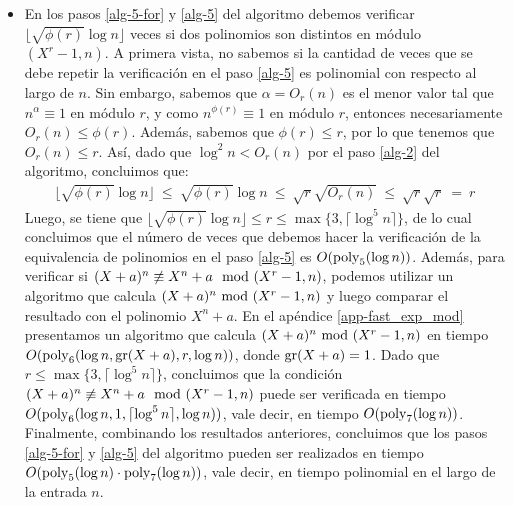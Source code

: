 \begin{itemize}
	
	\item En los pasos \ref{alg-5-for} y \ref{alg-5} del algoritmo debemos verificar $\lfloor \sqrt{\phi(r)} \log n\rfloor$ veces si dos polinomios son distintos en módulo $(X^r-1,n)$. A primera vista, no sabemos si la cantidad de veces que se debe repetir la verificación en el paso \ref{alg-5}
	es polinomial con respecto al largo de $n$. Sin embargo, sabemos que $\alpha = O_r(n)$ es el menor valor tal que $n^{\alpha}\equiv 1$ en módulo $r$, y como $n^{\phi(r)}\equiv 1$ en módulo $r$, entonces necesariamente $O_r(n)\leq \phi(r)$. Además, sabemos que $\phi(r)\leq r$, por lo que tenemos que $O_r(n)\leq r$. Así, dado que $\log^2 n < O_r(n)$ por el paso \ref{alg-2} del algoritmo, concluimos que:
	\begin{eqnarray}\label{cota-ell}
		\lfloor \sqrt{\phi(r)} \log n\rfloor \ \leq \ \sqrt{\phi(r)} \log n
		\ \leq \ \sqrt{r}\sqrt{O_r(n)} \ \leq \ \sqrt{r}\sqrt{r}
		\ = \ r
	\end{eqnarray}
	Luego, se tiene que $\lfloor \sqrt{\phi(r)} \log n\rfloor\leq r \leq  \max\{3,\lceil \log ^5 n\rceil\}$, de lo cual concluimos que el número de veces que debemos hacer la verificación de la equivalencia de polinomios en el paso \ref{alg-5} es $O({\rm poly}_5(\log n))$. Además, para verificar si $(X+a)^n \not\equiv X^n+a \mod(X^r-1,n)$, podemos utilizar un algoritmo que calcula $(X+a)^n \!\! \mod(X^r-1,n)$ y luego comparar el resultado con el polinomio $X^n+a$. En el apéndice \ref{app-fast_exp_mod} presentamos un algoritmo que calcula $(X+a)^n \!\! \mod(X^r-1,n)$ en tiempo $O({\rm poly}_6(\log n, {\rm gr}(X+a), r, \log n))$, donde ${\rm gr}(X+a) = 1$.
        Dado que $r \leq  \max\{3,\lceil \log ^5 n\rceil\}$, concluimos que la condición $(X+a)^n \not\equiv X^n+a \mod(X^r-1,n)$ puede ser verificada en tiempo $O({\rm poly}_6(\log n, 1, \lceil \log ^5 n\rceil, \log n))$, vale decir, en tiempo $O({\rm poly}_7(\log n))$. Finalmente, combinando los resultados anteriores, concluimos que los pasos \ref{alg-5-for} y \ref{alg-5} del algoritmo pueden ser realizados en tiempo $O({\rm poly}_5(\log n) \cdot {\rm poly}_7(\log n))$, vale decir, en tiempo polinomial en el largo de la entrada $n$.
	\end{itemize}
		
